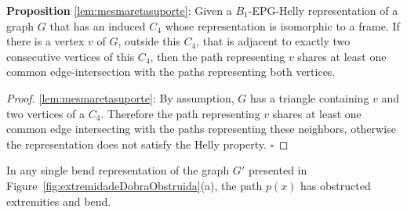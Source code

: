 \documentclass[runningheads]{llncs}
\begin{document}
\begin{pro*} \textbf{Proposition} \ref{lem:mesmaretasuporte}:
Given a $B_1$-EPG-Helly representation of a graph $G$ that has an induced $C_4$ whose representation is isomorphic to a frame. If there is a vertex $v$ of $G$, outside this $C_4$, that is adjacent to exactly two consecutive vertices of this $C_4$, then the path representing $v$ shares at least one common edge-intersection with the paths representing both vertices.%
\end{pro*}

\begin{proof} %
\ref{lem:mesmaretasuporte}:
By assumption, $G$ has a triangle containing $v$ and two vertices of a $C_4$. Therefore the path representing $v$ shares at least one common edge intersecting with the paths representing these neighbors, otherwise the representation does not satisfy the Helly property.
$\square$ \end{proof}


\begin{proposition}
In any single bend representation of the graph $G'$ presented in Figure~\ref{fig:extremidadeDobraObstruida}(a), the path $p(x)$ has obstructed extremities and bend.
\end{proposition}
\end{document}
